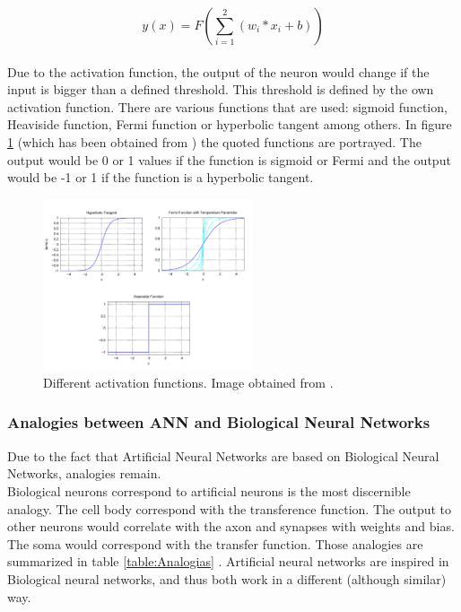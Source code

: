 			\begin{equation}
			y(x)=F(\sum_{i=1}^{2} (w_{i}*x_{i} + b) )
			\label{eq:ecuation_neuronasencilla}
			\end{equation}\\

Due to the activation function, the output of the neuron would change if the input is bigger than a defined threshold. This threshold is defined by the own activation function. There are various functions that are used: sigmoid function, Heaviside function, Fermi function or hyperbolic tangent among others. In figure \ref{fig:activation_function} (which has been obtained from \cite{BINN}) the quoted functions are portrayed. The output would be 0 or 1 values if the function is sigmoid or Fermi and the output would be -1 or 1 if the function is a hyperbolic tangent. \\

\begin{figure}[htb]
\centering
\includegraphics[width=0.55\textwidth]{images_miscelaneus/activation_function.PNG}
\caption{Different activation functions. Image obtained from \cite{BINN}.} \label{fig:activation_function}
\end{figure}

\subsubsection{Analogies between ANN and Biological Neural Networks}
Due to the fact that Artificial Neural Networks are based on Biological Neural Networks, analogies remain.\\

Biological neurons correspond to artificial neurons is the most discernible analogy. The cell body correspond with the transference function. The output to other neurons would correlate with the axon and synapses with weights and bias. The soma would correspond with the transfer function. Those analogies are summarized in table \ref{table:Analogias} \cite{Analogies}. Artificial neural networks are inspired in Biological neural networks, and thus both work in a different (although similar) way.\\

